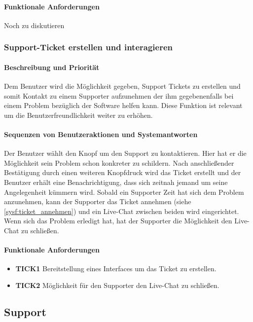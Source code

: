 \paragraph{Funktionale Anforderungen}
Noch zu diskutieren

\subsubsection{Support-Ticket erstellen und interagieren}
\label{sysf:ticket_erstellen}
\paragraph{Beschreibung und Priorität}
Dem Benutzer wird die Möglichkeit gegeben, Support Tickets zu erstellen und somit Kontakt zu einem Supporter aufzunehmen der ihm gegebenenfalls bei einem Problem bezüglich der Software helfen kann. Diese Funktion ist relevant um die Benutzerfreundlichkeit weiter zu erhöhen.
\paragraph{Sequenzen von Benutzeraktionen und Systemantworten}
Der Benutzer wählt den Knopf um den Support zu kontaktieren. Hier hat er die Möglichkeit sein Problem schon konkreter zu schildern. Nach anschließender Bestätigung durch einen weiteren Knopfdruck wird das Ticket erstellt und der Benutzer erhält eine Benachrichtigung, dass sich zeitnah jemand um seine Angelegenheit kümmern wird. Sobald ein Supporter Zeit hat sich dem Problem anzunehmen, kann der Supporter das Ticket annehmen (siehe \ref{sysf:ticket_annehmen}) und ein Live-Chat zwischen beiden wird eingerichtet. Wenn sich das Problem erledigt hat, hat der Supporter die Möglichkeit den Live-Chat zu schließen.
\paragraph{Funktionale Anforderungen}
\begin{itemize}
\item \textbf{TICK1} Bereitstellung eines Interfaces um das Ticket zu erstellen.
\item \textbf{TICK2} Möglichkeit für den Supporter den Live-Chat zu schließen.
\end{itemize}


\subsection{Support}
